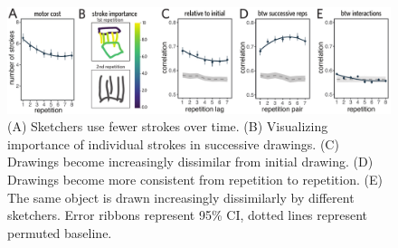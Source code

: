 \documentclass[11pt,letterpaper]{article}
\begin{document}

\begin{figure}[b!]
\includegraphics[width=\linewidth]{figures/drawing_changes.pdf}
\centering
\caption{(A) Sketchers use fewer strokes over time. (B) Visualizing importance of individual strokes in successive drawings. (C) Drawings become increasingly dissimilar from initial drawing. (D) Drawings become more consistent from repetition to repetition. %
(E) The same object is drawn increasingly dissimilarly by different sketchers. %
Error ribbons represent 95\% CI, dotted lines represent permuted baseline.}
\label{within-across}
\end{figure}
\end{document}
